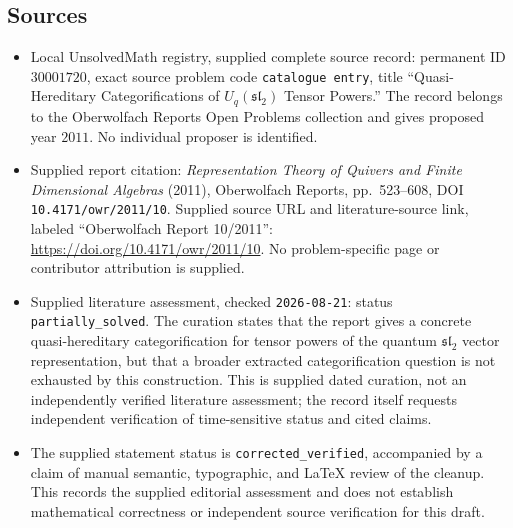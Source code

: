 \documentclass[11pt]{article}
\begin{document}
\subsection{Sources}
\begin{itemize}
\item Local UnsolvedMath registry, supplied complete source record: permanent ID \(30001720\), exact source problem code \texttt{catalogue entry}, title ``Quasi-Hereditary Categorifications of \(U_q(\mathfrak{sl}_2)\) Tensor Powers.'' The record belongs to the Oberwolfach Reports Open Problems collection and gives proposed year \(2011\). No individual proposer is identified.
\item Supplied report citation: \emph{Representation Theory of Quivers and Finite Dimensional Algebras} (2011), Oberwolfach Reports, pp.\ 523--608, DOI \texttt{10.4171/owr/2011/10}. Supplied source URL and literature-source link, labeled ``Oberwolfach Report 10/2011'': \url{https://doi.org/10.4171/owr/2011/10}. No problem-specific page or contributor attribution is supplied.
\item Supplied literature assessment, checked \texttt{2026-08-21}: status \texttt{partially\_solved}. The curation states that the report gives a concrete quasi-hereditary categorification for tensor powers of the quantum \(\mathfrak{sl}_2\) vector representation, but that a broader extracted categorification question is not exhausted by this construction. This is supplied dated curation, not an independently verified literature assessment; the record itself requests independent verification of time-sensitive status and cited claims.
\item The supplied statement status is \texttt{corrected\_verified}, accompanied by a claim of manual semantic, typographic, and LaTeX review of the cleanup. This records the supplied editorial assessment and does not establish mathematical correctness or independent source verification for this draft.
\end{itemize}
\end{document}
